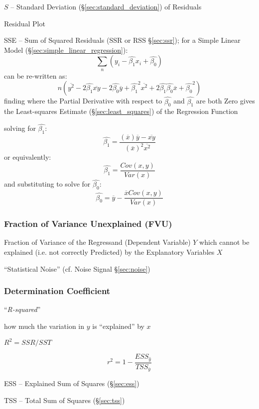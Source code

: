 $S$ -- Standard Deviation (\S\ref{sec:standard_deviation}) of Residuals

Residual Plot

SSE -- Sum of Squared Residuals (SSR or RSS \S\ref{sec:ssr}); for a Simple
Linear Model (\S\ref{sec:simple_linear_regression}):
\[
  \sum_n (y_i - \hat{\beta_1} x_i + \hat{\beta_0})
\]
can be re-written as:
\[
  n (\overline{y^2} - 2 \hat{\beta_1} \overline{x y}
    - 2 \hat{\beta_0} \overline{y} + \hat{\beta_1}^2 \overline{x^2}
    + 2 \hat{\beta_1} \hat{\beta_0} \overline{x} + \hat{\beta_0}^2)
\]
finding where the Partial Derivative with respect to $\hat{\beta_0}$ and
$\hat{\beta_1}$ are both Zero gives the Least-squares Estimate
(\S\ref{sec:least_squares}) of the Regression Function

solving for $\hat{\beta_1}$:
\[
  \hat{\beta_1} = \frac{
    (\overline{x})\overline{y} - \overline{xy}
  }{
    (\overline{x})^2 \overline{x^2}
  }
\]
or equivalently:
\[
  \hat{\beta_1} = \frac{
    Cov(x,y)
  }{
    Var(x)
  }
\]
and substituting to solve for $\hat{\beta_0}$:
\[
  \hat{\beta_0} = \overline{y} - \frac{
    \overline{x} Cov(x,y)
  }{
    Var(x)
  }
\]



\subsubsection{Fraction of Variance Unexplained (FVU)}\label{sec:fvu}

Fraction of Variance of the Regressand (Dependent Variable) $Y$ which cannot be
explained (i.e. not correctly Predicted) by the Explanatory Variables $X$

``Statistical Noise'' (cf. Noise Signal \S\ref{sec:noise})



\subsubsection{Determination Coefficient}\label{sec:determination_coefficient}

``\emph{R-squared}''

how much the variation in $y$ is ``explained'' by $x$

$R^2 = SSR/SST$

\[
  r^2 = 1 - \frac{
    ESS_{\hat{y}}
  }{
    TSS_{\overline{y}}
  }
\]

ESS -- Explained Sum of Squares (\S\ref{sec:ess})

TSS -- Total Sum of Squares (\S\ref{sec:tss})

